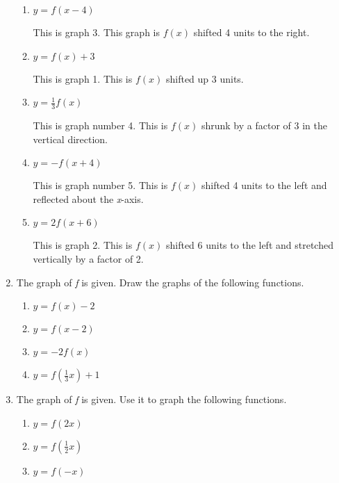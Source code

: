 \documentclass{article}
\begin{document}
\begin{enumerate}
\begin{enumerate}
			\item $y = f(x - 4)$
			
				This is graph 3. This graph is $f(x)$ shifted 4 units to the right.
				
			\item $y = f(x) + 3$
			
				This is graph 1. This is $f(x)$ shifted up 3 units.
				
			\item $y = \frac{1}{3}f(x)$
			
			This is graph number 4. This is $f(x)$ shrunk by a factor of 3 in the vertical direction.
			
			\item $y = - f(x + 4)$
			
				This is graph number 5. This is $f(x)$ shifted 4 units to the left and reflected about
				the \emph{x}-axis.
				
			\item $y = 2f(x + 6)$
			
				This is graph 2. This is $f(x)$ shifted 6 units to the left and stretched vertically by a
				factor of 2.
			
		\end{enumerate}
		
		\item The graph of \emph{f} is given. Draw the graphs of the following functions.
		
		\begin{enumerate}
		
			\item $y = f(x) - 2$
			
			\item $y = f(x - 2)$
			
			\item $y = -2f(x)$
			
			\item $y = f(\frac{1}{3}x) + 1$
		\end{enumerate}
		
		\item The graph of \emph{f} is given. Use it to graph the following functions.
		
		\begin{enumerate}
		
			\item $y = f(2x)$
			
			\item $y = f(\frac{1}{2}x)$
			
			\item $y = f(-x)$
			

\end{enumerate}
\end{enumerate}
\end{document}
